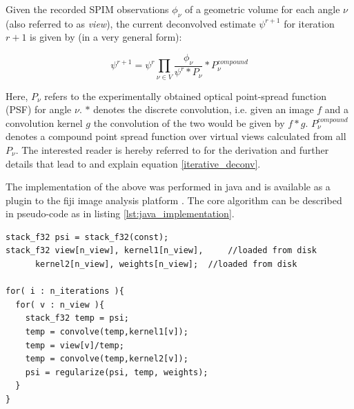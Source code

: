 Given the recorded SPIM observations $\phi_\nu$ of a geometric volume for each angle $\nu$ (also referred to as \textit{view}), the current deconvolved estimate $\psi^{r+1}$ for iteration $r+1$ is given by (in a very general form):\newline

\begin{equation}
\psi^{r+1} = \psi^{r} \prod_{\nu \in V} \frac{\phi_{\nu}}{\psi^{r} \ast P_{\nu} } \ast P^{compound}_{\nu}
\label{iterative_deconv}
\end{equation}

Here, $P_{\nu}$ refers to the experimentally obtained optical point-spread function (PSF) for angle $\nu$. $\ast$ denotes the discrete convolution, i.e. given an image $f$ and a convolution kernel $g$ the convolution of the two would be given by $f \ast g$. $P^{compound}_{\nu}$ denotes a compound point spread function over virtual views calculated from all $P_{\nu}$. The interested reader is hereby referred to \cite{2013arXiv1308.0730P} for the derivation and further details that lead to and explain equation \ref{iterative_deconv}.\newline

The implementation of the above was performed in java \cite{fiji_wiki_mvd} and is available as a plugin to the fiji image analysis platform \cite{fiji_website}. The core algorithm can be described in pseudo-code as in listing \ref{lst:java_implementation}.\newline

\begin{lstlisting}[caption={Java Implementation of Multi-View Deconvolution.},label={lst:java_implementation}]
stack_f32 psi = stack_f32(const);
stack_f32 view[n_view], kernel1[n_view],     //loaded from disk
	  kernel2[n_view], weights[n_view];  //loaded from disk

for( i : n_iterations ){
  for( v : n_view ){
    stack_f32 temp = psi;
    temp = convolve(temp,kernel1[v]);	    
    temp = view[v]/temp;
    temp = convolve(temp,kernel2[v]);	    
    psi = regularize(psi, temp, weights);
  }
}
\end{lstlisting}

